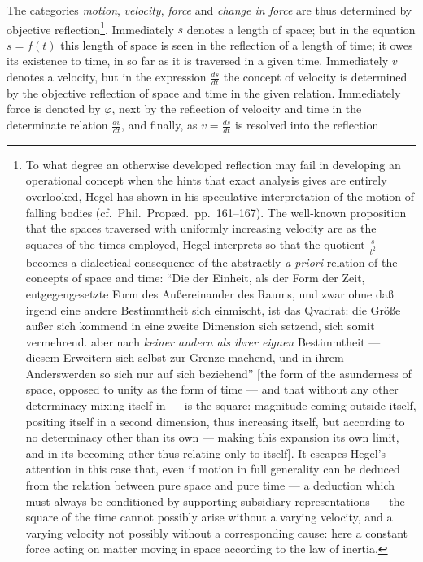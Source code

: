 \documentclass[12pt,a4paper]{book}
\begin{document}
The categories \emph{motion}, \emph{velocity}, \emph{force} and \emph{change in
force} are thus determined by objective reflection\footnote{To what degree an
otherwise developed reflection may fail in developing an operational concept
when the hints that exact analysis gives are entirely overlooked, Hegel has
shown in his speculative interpretation of the motion of falling bodies (cf.\
Phil.\ Propæd.\ pp.~161--167). The well-known proposition that the spaces
traversed with uniformly increasing velocity are as the squares of the times
employed, Hegel interprets so that the quotient $\frac{s}{t^{2}}$ becomes a
dialectical consequence of the abstractly \textit{a priori} relation of the
concepts of space and time: ``Die
der Einheit, als der Form der Zeit, entgegengesetzte Form des
Außereinander des Raums, und zwar ohne daß irgend eine andere
Bestimmtheit sich einmischt, ist das Qvadrat: die Größe außer sich
kommend in eine zweite Dimension sich setzend, sich somit vermehrend.
aber nach \emph{keiner andern als ihrer eignen} Bestimmtheit ---
diesem Erweitern sich selbst zur Grenze machend, und in ihrem
Anderswerden so sich nur auf sich beziehend'' [the form of the
asunderness of space, opposed to unity as the form of time --- and that without
any other determinacy mixing itself in --- is the square: magnitude coming
outside itself, positing itself in a second dimension, thus increasing itself,
but according to no determinacy other than its own --- making this expansion
its own limit, and in its becoming-other thus relating only to itself]. It
escapes Hegel's attention in this case that, even if motion in full generality
can be deduced from the relation between pure space and pure time --- a
deduction which must always be conditioned by supporting subsidiary
representations --- the square of the time cannot possibly arise without a
varying velocity, and a varying velocity not possibly without a corresponding
cause: here a constant force acting on matter moving in space according to the
law of inertia.}. Immediately $s$ denotes a length of space; but in the
equation $s = f(t)$ this length of space is seen in the reflection of a length
of time; it owes its existence to time, in so far as it is traversed in a given
time. Immediately $v$ denotes a velocity, but in the expression
$\frac{ds}{dt}$ the concept of velocity is determined by the objective
reflection of space and time in the given relation. Immediately force is
denoted by $\varphi$, next by the reflection of velocity and time in the
determinate relation $\frac{dv}{dt}$, and finally, as $v = \frac{ds}{dt}$ is
resolved into the reflection
\end{document}
